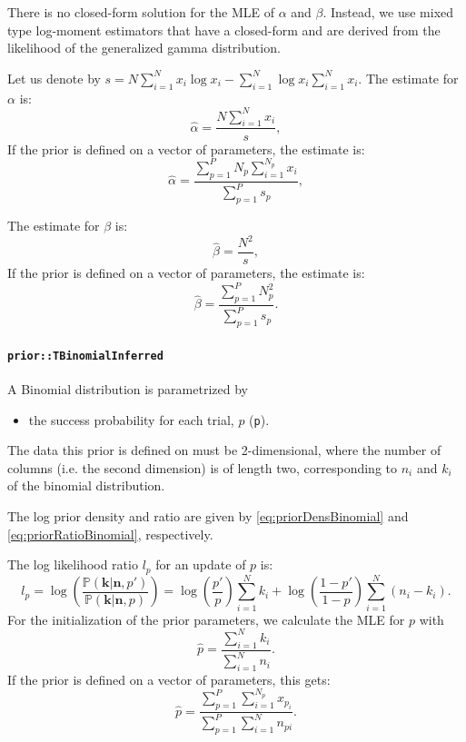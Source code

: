\documentclass[a4paper,11pt]{article}
\def\p{\mathbb{P}}
\newcommand{\class}[1]{\texttt{#1}}
\newcommand{\privparam}[1]{\texttt{\textunderscore #1}}
\begin{document}
There is no closed-form solution for the MLE of $\alpha$ and $\beta$. Instead, we use mixed type log-moment estimators that have a closed-form and are derived from the likelihood of the generalized gamma distribution.

Let us denote by $s = N \sum_{i=1}^N x_i \log x_i - \sum_{i=1}^N \log x_i \sum_{i=1}^N x_i$.
The estimate for $\alpha$ is:
\begin{equation*}
 \hat \alpha = \frac{N \sum_{i=1}^N x_i}{s},
\end{equation*}
If the prior is defined on a vector of parameters, the estimate is:
\begin{equation*}
 \hat \alpha = \frac{\sum_{p=1}^P N_p \sum_{i=1}^{N_p} x_i}{\sum_{p=1}^P s_p},
\end{equation*}

The estimate for $\beta$ is:
\begin{equation*}
 \hat \beta = \frac{N^2}{s},
\end{equation*}
If the prior is defined on a vector of parameters, the estimate is:
\begin{equation*}
 \hat \beta = \frac{\sum_{p=1}^P N_p^2}{\sum_{p=1}^P s_p}.
\end{equation*}

\paragraph{\class{prior::TBinomialInferred}}
A Binomial distribution is parametrized by
\begin{itemize}
 \item the success probability for each trial, $p$ (\privparam{p}).
\end{itemize}
The data this prior is defined on must be 2-dimensional, where the number of columns (i.e. the second dimension) is of length two, corresponding to $n_i$ and $k_i$ of the binomial distribution.

The log prior density and ratio are given by \eqref{eq:priorDensBinomial} and \eqref{eq:priorRatioBinomial}, respectively.

The log likelihood ratio $l_p$ for an update of $p$ is:
\begin{equation*}
 l_p = \log \left(\frac{\p(\boldsymbol k | \boldsymbol n, p')}{\p(\boldsymbol k | \boldsymbol n, p)} \right) = \log\left(\frac{p'}{p} \right) \sum_{i=1}^N k_i + \log\left(\frac{1-p'}{1-p} \right) \sum_{i=1}^N \left(n_i - k_i \right).
\end{equation*}
For the initialization of the prior parameters, we calculate the MLE for $p$ with
\begin{equation*}
 \hat{p} = \frac{\sum_{i=1}^N k_i}{\sum_{i=1}^N n_i}.
\end{equation*}
If the prior is defined on a vector of parameters, this gets:
\begin{equation*}
 \hat{p} = \frac{\sum_{p=1}^P \sum_{i=1}^{N_p} x_{p_i}}{\sum_{p=1}^P \sum_{i=1}^N n_{pi}}.
\end{equation*}
\end{document}
